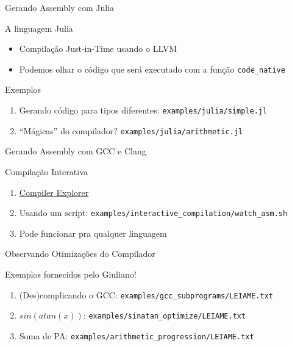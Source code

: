 \documentclass[10pt, compress, aspectratio=169, xcolor={table,usenames,dvipsnames}]{beamer}
\begin{document}
\begin{frame}[label={sec:org4197d46},fragile]{Gerando Assembly com Julia}
 \begin{block}{A linguagem Julia}
\begin{itemize}
\item Compilação \alert{Just-in-Time} usando o LLVM
\item Podemos olhar o código que será executado com a função \texttt{code\_native}
\end{itemize}
\end{block}
\begin{block}{Exemplos}
\begin{enumerate}
\item Gerando código para \alert{tipos diferentes}: \texttt{examples/julia/simple.jl}
\item \alert{``Mágicas''} do compilador? \texttt{examples/julia/arithmetic.jl}
\end{enumerate}
\end{block}
\end{frame}
\begin{frame}[label={sec:org76d5025},fragile]{Gerando Assembly com GCC e Clang}
 \begin{block}{Compilação Interativa}
\begin{enumerate}
\item \href{https://godbolt.org/}{Compiler Explorer}
\item Usando um script: \texttt{examples/interactive\_compilation/watch\_asm.sh}
\item Pode funcionar pra qualquer linguagem
\end{enumerate}
\end{block}
\end{frame}
\begin{frame}[label={sec:org71f3f80},fragile]{Observando Otimizações do Compilador}
 \begin{block}{Exemplos fornecidos pelo \alert{Giuliano}!}
\begin{enumerate}
\item (Des)complicando o GCC: \texttt{examples/gcc\_subprograms/LEIAME.txt}
\item \(sin(atan(x))\): \texttt{examples/sinatan\_optimize/LEIAME.txt}
\item Soma de PA: \texttt{examples/arithmetic\_progression/LEIAME.txt}
\end{enumerate}
\end{block}
\end{frame}
\end{document}
